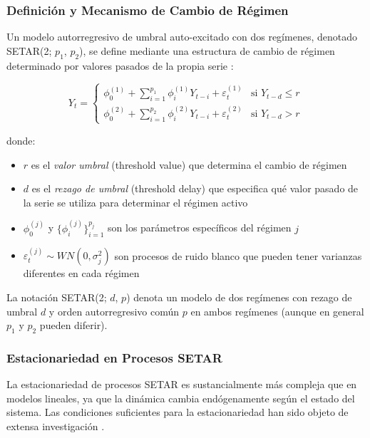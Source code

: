 \subsubsection{Definición y Mecanismo de Cambio de Régimen}

Un modelo autorregresivo de umbral auto-excitado con dos regímenes, denotado SETAR(2; $p_1$, $p_2$), se define mediante una estructura de cambio de régimen determinado por valores pasados de la propia serie \parencite{Chen2023}:

\begin{equation}
Y_t = 
\begin{cases}
\phi_0^{(1)} + \sum_{i=1}^{p_1} \phi_i^{(1)} Y_{t-i} + \varepsilon_t^{(1)} & \text{si } Y_{t-d} \leq r \\
\phi_0^{(2)} + \sum_{i=1}^{p_2} \phi_i^{(2)} Y_{t-i} + \varepsilon_t^{(2)} & \text{si } Y_{t-d} > r
\end{cases}
\label{eq:setar_general}
\end{equation}

donde:
\begin{itemize}
\item $r$ es el \textit{valor umbral} (threshold value) que determina el cambio de régimen
\item $d$ es el \textit{rezago de umbral} (threshold delay) que especifica qué valor pasado de la serie se utiliza para determinar el régimen activo
\item $\phi_0^{(j)}$ y $\{\phi_i^{(j)}\}_{i=1}^{p_j}$ son los parámetros específicos del régimen $j$
\item $\varepsilon_t^{(j)} \sim WN(0, \sigma_j^2)$ son procesos de ruido blanco que pueden tener varianzas diferentes en cada régimen
\end{itemize}

La notación SETAR(2; $d$, $p$) denota un modelo de dos regímenes con rezago de umbral $d$ y orden autorregresivo común $p$ en ambos regímenes (aunque en general $p_1$ y $p_2$ pueden diferir).

\subsubsection{Estacionariedad en Procesos SETAR}
\label{subsec:setar_stationarity}

La estacionariedad de procesos SETAR es sustancialmente más compleja que en modelos lineales, ya que la dinámica cambia endógenamente según el estado del sistema. Las condiciones suficientes para la estacionariedad han sido objeto de extensa investigación \parencite{Chen2023}.

